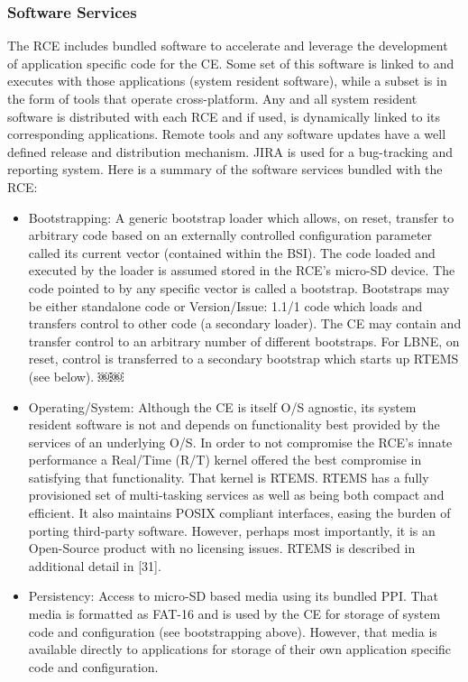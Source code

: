 \subsubsection{Software Services}
\label{sec:Services}
The RCE includes bundled software to accelerate and leverage the development of application specific code for the CE. Some set of this software is linked to and executes with those applications (system resident software), while a subset is in the form of tools that operate cross-platform. Any and all system resident software is distributed with each RCE and if used, is dynamically linked to its corresponding applications. Remote tools and any software updates have a well defined release and distribution mechanism. JIRA is used for a bug-tracking and reporting system. Here is a summary of the software services bundled with the RCE:
\begin{itemize}
\item Bootstrapping: A generic bootstrap loader which allows, on reset, transfer to arbitrary code based on an externally controlled configuration parameter called its current vector (contained within the BSI). The code loaded and executed by the loader is assumed stored in the RCE's micro-SD device. The code pointed to by any specific vector is called a bootstrap. Bootstraps may be either standalone code or Version/Issue: 1.1/1
code which loads and transfers control to other code (a secondary loader). The CE may contain and transfer control to an arbitrary number of different bootstraps. For LBNE, on reset, control is transferred to a secondary bootstrap which starts up RTEMS (see below).
￼￼\item Operating/System: Although the CE is itself O/S agnostic, its system resident software is not and depends on functionality best provided by the services of an underlying O/S. In order to not compromise the RCE's innate performance a Real/Time (R/T) kernel offered the best compromise in satisfying that functionality. That kernel is RTEMS. RTEMS has a fully provisioned set of multi-tasking services as well as being both compact and efficient. It also maintains POSIX compliant interfaces, easing the burden of porting third-party software. However, perhaps most importantly, it is an Open-Source product with no licensing issues. RTEMS is described in additional detail in [31].
\item Persistency:
Access to micro-SD based media using its bundled PPI. That media is formatted as FAT-16 and is used by the CE for storage of system code and configuration (see bootstrapping above). However, that media is available directly to applications for storage of their own application specific code and configuration.

\end{itemize}
